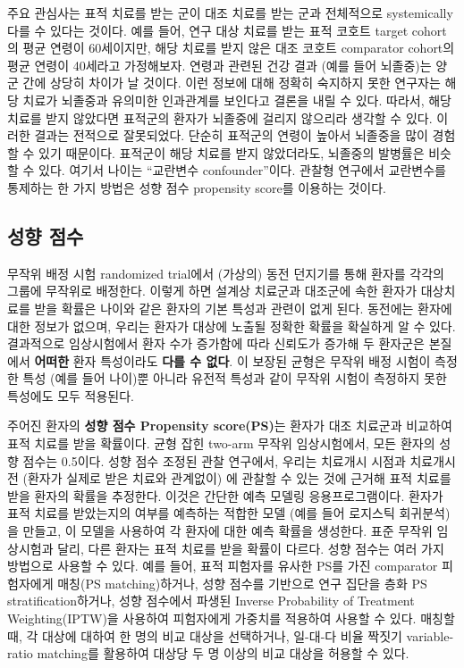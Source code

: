 \documentclass[10.5pt]{book}
\theoremstyle{definition}
\theoremstyle{definition}
\theoremstyle{definition}
\theoremstyle{remark}
\begin{document}
주요 관심사는 표적 치료를 받는 군이 대조 치료를 받는 군과 전체적으로
systemically 다를 수 있다는 것이다. 예를 들어, 연구 대상 치료를 받는
표적 코호트 target cohort의 평균 연령이 60세이지만, 해당 치료를 받지
않은 대조 코호트 comparator cohort의 평균 연령이 40세라고 가정해보자.
연령과 관련된 건강 결과 (예를 들어 뇌졸중)는 양 군 간에 상당히 차이가 날
것이다. 이런 정보에 대해 정확히 숙지하지 못한 연구자는 해당 치료가
뇌졸중과 유의미한 인과관계를 보인다고 결론을 내릴 수 있다. 따라서, 해당
치료를 받지 않았다면 표적군의 환자가 뇌졸중에 걸리지 않으리라 생각할 수
있다. 이러한 결과는 전적으로 잘못되었다. 단순히 표적군의 연령이 높아서
뇌졸중을 많이 경험할 수 있기 때문이다. 표적군이 해당 치료를 받지
않았더라도, 뇌졸중의 발병률은 비슷할 수 있다. 여기서 나이는 ``교란변수
confounder''이다. 관찰형 연구에서 교란변수를 통제하는 한 가지 방법은
성향 점수 propensity score를 이용하는 것이다. 

\subsection{성향 점수}\label{-}


무작위 배정 시험 randomized trial에서 (가상의) 동전 던지기를 통해 환자를
각각의 그룹에 무작위로 배정한다. 이렇게 하면 설계상 치료군과 대조군에
속한 환자가 대상치료를 받을 확률은 나이와 같은 환자의 기본 특성과 관련이
없게 된다. 동전에는 환자에 대한 정보가 없으며, 우리는 환자가 대상에
노출될 정확한 확률을 확실하게 알 수 있다. 결과적으로 임상시험에서 환자
수가 증가함에 따라 신뢰도가 증가해 두 환자군은 본질에서 \textbf{어떠한}
환자 특성이라도 \textbf{다를 수 없다}. 이 보장된 균형은 무작위 배정
시험이 측정한 특성 (예를 들어 나이)뿐 아니라 유전적 특성과 같이 무작위
시험이 측정하지 못한 특성에도 모두 적용된다. 

주어진 환자의 \textbf{성향 점수 Propensity score(PS)}는 환자가 대조
치료군과 비교하여 표적 치료를 받을 확률이다. \citep{rosenbaum_1983} 균형
잡힌 two-arm 무작위 임상시험에서, 모든 환자의 성향 점수는 0.5이다. 성향
점수 조정된 관찰 연구에서, 우리는 치료개시 시점과 치료개시 전 (환자가
실제로 받은 치료와 관계없이) 에 관찰할 수 있는 것에 근거해 표적 치료를
받을 환자의 확률을 추정한다. 이것은 간단한 예측 모델링 응용프로그램이다.
환자가 표적 치료를 받았는지의 여부를 예측하는 적합한 모델 (예를 들어
로지스틱 회귀분석)을 만들고, 이 모델을 사용하여 각 환자에 대한 예측
확률을 생성한다. 표준 무작위 임상시험과 달리, 다른 환자는 표적 치료를
받을 확률이 다르다. 성향 점수는 여러 가지 방법으로 사용할 수 있다. 예를
들어, 표적 피험자를 유사한 PS를 가진 comparator 피험자에게 매칭(PS
matching)하거나, 성향 점수를 기반으로 연구 집단을 층화 PS
stratification하거나, 성향 점수에서 파생된 Inverse Probability of
Treatment Weighting(IPTW)을 사용하여 피험자에게 가중치를 적용하여 사용할
수 있다. 매칭할 때, 각 대상에 대하여 한 명의 비교 대상을 선택하거나,
일-대-다 비율 짝짓기 variable-ratio matching를 활용하여 대상당 두 명
이상의 비교 대상을 허용할 수 있다. \citep{rassen_2012}
 
\end{document}
